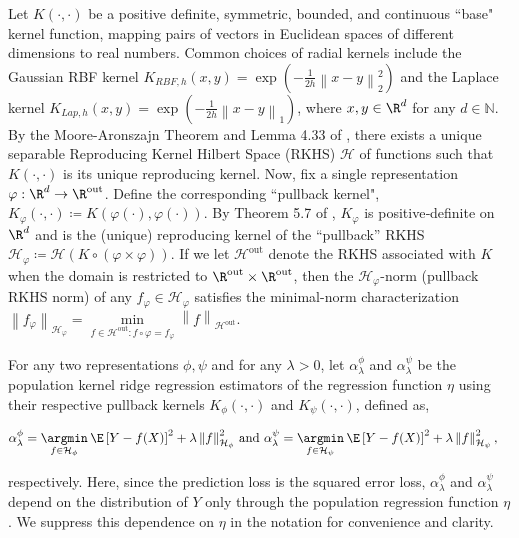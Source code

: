 \documentclass{article} %
\newcommand{\N}{\mathbb{N}}
\newcommand{\Hil}{\mathcal{H}}
\newcommand{\rep}{\varphi}
\newcommand{\repone}{\phi}
\newcommand{\reptwo}{\psi}
\newcommand{\Hone}{\mathcal{H}_{\phi}}
\newcommand{\Htwo}{\mathcal{H}_{\psi}}
\newcommand{\Hrep}{\mathcal{H}_{\varphi}}
\newcommand{\norm}[1]{\left\|#1\right\|}
\theoremstyle{plain}
\begin{document}
Let $K(\cdot,\cdot)$ be a positive definite, symmetric, bounded, and continuous ``base" kernel function, mapping pairs of vectors in Euclidean spaces of different dimensions to real numbers. Common choices of radial kernels include the Gaussian RBF kernel $K_{RBF,h}(x,y) = \exp(-\frac{1}{2h}\norm{x-y}_{2}^{2})$ and the Laplace kernel $K_{Lap,h}(x,y) = \exp(-\frac{1}{2h}\norm{x-y}_{1})$, where $x,y\in \R^{d}$ for any $d\in \N$. By the Moore-Aronszajn Theorem \citep{aronszajn1950theory} and Lemma 4.33 of \citet{steinwart2008support}, there exists a unique separable Reproducing Kernel Hilbert Space (RKHS) $\Hil$ of functions such that $K(\cdot,\cdot)$ is its unique reproducing kernel. Now, fix a single representation  $\rep: \R^{d}\rightarrow \R^{\textrm{out}}$. Define the corresponding ``pullback kernel", $K_{\rep}(\cdot,\cdot) \coloneq K(\rep(\cdot),\rep(\cdot))$. By Theorem 5.7 of \citet{paulsen2016introduction}, $K_{\rep}$ is positive‑definite on $\R^{d}$ and is the (unique) reproducing kernel of the ``pullback'' RKHS $\Hrep \coloneq \Hil\left(K \circ \left(\rep \times \rep\right)\right)$. If we let $\Hil^{\textrm{out}}$ denote the RKHS associated with $K$ when the domain is restricted to $\R^{\textrm{out}} \times \R^{\textrm{out}}$, then the $\Hrep$-norm (pullback RKHS norm) of any $f_{\rep}\in \Hrep$ satisfies the minimal-norm characterization 
$\norm{f_{\rep}}_{\Hrep}=\underset{f \in \Hil^{\textrm{out}}: f \circ \rep = f_{\rep}}{\min}\norm{f}_{\Hil^{\textrm{out}}}$. 


For any two representations $\repone,\reptwo$ and for any $\lambda>0$, let $\alpha_{\lambda}^{\repone}$ and $\alpha_{\lambda}^{\reptwo}$ be the population kernel ridge regression estimators of the regression function $\eta$ using their respective pullback kernels $K_{\repone}(\cdot,\cdot)$ and $K_{\reptwo}(\cdot,\cdot)$, defined as,

\begin{equation}\label{Defintion of alpha}
\begin{aligned}
    \alpha_{\lambda}^{\repone} = \underset{f \in \Hone}{\argmin} \hspace{2pt} \E\left[Y-f(X)\right]^{2} + \lambda \norm{f}_{\Hone}^{2} &\textrm{ and }\alpha_{\lambda}^{\reptwo} = \underset{f \in \Htwo}{\argmin} \hspace{2pt} \E\left[Y-f(X)\right]^{2} + \lambda \norm{f}_{\Htwo}^{2},
\end{aligned}
\end{equation}


respectively. Here, since the prediction loss is the squared error loss, $\alpha_{\lambda}^{\repone}$ and $\alpha_{\lambda}^{\reptwo}$ depend on the distribution of $Y$ only through the population regression function $\eta$. We suppress this dependence on $\eta$ in the notation for convenience and clarity.
\end{document}
